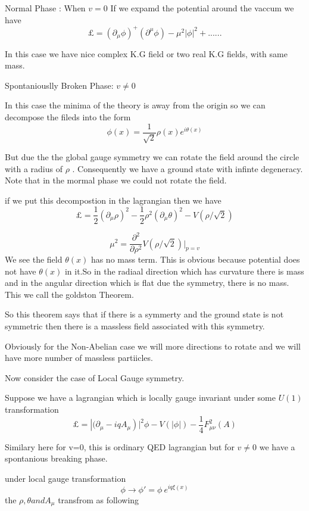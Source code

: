 \documentclass[12pt]{article}
\newcommand{\be}{\begin{equation}}
\newcommand{\ee}{\end{equation}}
\begin{document}
Normal Phase : When $v=0$
If we expamd the potential around the vaccum we have
\be \pounds =\left (\partial_{\mu} \phi\right)^{+} \left (\partial^{\mu}\phi\right)-\mu^{2} |\phi|^{2}+...... \ee

In this case we have nice complex K.G field or two real K.G fields, with same mass.

Spontaniouslly Broken Phase:
$ v \neq 0$

In this case the minima of the theory is away from the origin so we can decompose the fileds into the form
\be \phi(x) = \frac{1}{\sqrt{2}} \rho(x) e^{i \theta(x)} \ee

But due the the global gauge symmetry we can rotate the field around the circle with a radius of $\rho$ . Consequently we have a ground state with infinte degeneracy. Note that in the mormal phase we could not rotate the field.

if we put this decompostion in the lagrangian then we have 
\be \pounds = \frac{1}{2} \left (\partial_{\mu} \rho\right)^{2}-\frac{1}{2} \rho^{2} \left (\partial_{\mu} \theta \right)^{2}  -V(\rho/ \sqrt{2}) \ee

\be \mu^{2} =\frac{\partial^{2}}{\partial \rho^{2}} V(\rho / \sqrt{2})  |_{p=v} \ee
 We see the field $\theta(x)$ has no mass term. This is obvious because potential does not have $\theta(x)$ in it.So in the radiaal direction which has curvature there is mass and in the angular direction which is flat due the symmetry, there is no mass. This we call the goldston Theorem.

So this theorem says that if there is a symmerty and the ground state is not symmetric then there is a massless field associated with this  symmetry.

Obviously for the Non-Abelian case we will more directions to rotate and we will have more number of massless partiicles.

Now consider the case of Local Gauge symmetry.

Suppose we have a lagrangian which is locally gauge invariant under some $U(1)$ transformation
\be \pounds =\left |(\partial_{\mu} -iq A_{\mu}\right)|^{2} \phi-V(|\phi|)-\frac{1}{4} F_{\mu \nu}^{2}(A)\ee

Similary here for v=0, this is ordinary QED lagrangian but for $v \neq 0 $ we have a spontanious breaking phase.

under local gauge transformation 
\be \phi \rightarrow \phi'= \phi~ e^{iq\xi(x)} \ee
the $\rho, \theta and A_{\mu}$ transfrom as following
\end{document}
